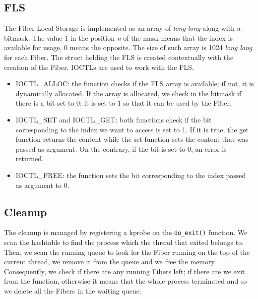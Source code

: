 \documentclass[11pt]{article}
\begin{document}
\subsection{FLS}
The Fiber Local Storage is implemented as an array of \textit{long} \textit{long} along with a bitmask. The value 1 in the position \textit{n} of the mask means that the index is available for usage, 0 means the opposite. The size of such array is 1024 \textit{long} \textit{long} for each Fiber. The struct holding the FLS is created contextually with the creation of the Fiber. IOCTLs are used to work with the FLS.
\begin{itemize}
\item IOCTL\_ALLOC: the function checks if the FLS array is available; if not, it is dynamically allocated. If the array is allocated, we check in the bitmask if there is a bit set to 0: it is set to 1 so that it can be used by the Fiber.
\item IOCTL\_SET and IOCTL\_GET: both functions check if the bit corresponding to the index we want to access is set to 1. If it is true, the get function returns the content while the set function sets the content that was passed as argument. On the contrary, if the bit is set to 0, an error is returned.
\item IOCTL\_FREE: the function sets the bit corresponding to the index passed as argument to 0.
\end{itemize}

\subsection{Cleanup}
The cleanup is managed by registering a kprobe on the \texttt{do\_exit()} function. We scan the hashtable to find the process which the thread that exited belongs to. Then, we scan the running queue to look for the Fiber running on the top of the current thread, we remove it from the queue and we free the memory. Consequently, we check if there are any running Fibers left; if there are we exit from the function, otherwise it means that the whole process terminated and so we delete all the Fibers in the waiting queue.
\end{document}
